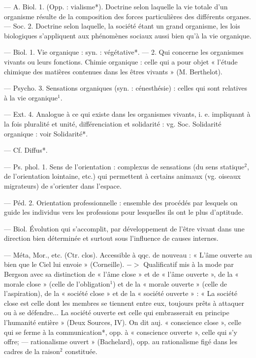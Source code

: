 \begin{itemize}[leftmargin=1cm, label=, itemsep=1pt]
 — A. Biol. 1. (Opp. :
vialisme*). Doctrine selon laquelle
la vie totale d’un organisme résulte
de la composition des forces particulières des différents organes. —
Soc. 2. Doctrine selon laquelle, la
société étant un grand organisme,
les lois biologiques s'appliquent aux
phénomènes sociaux aussi bien qu’à
la vie organique.

 — Biol. 1. Vie organique :
syn. : végétative*. — 2. Qui concerne
les organismes vivants ou leurs
fonctions. Chimie organique : celle
qui a pour objet « l’étude chimique
des matières contenues dans les
êtres vivants » (M. Berthelot).

— Psycho. 3. Sensations organiques (syn. : cénesthésie) : celles qui
sont relatives à la vie organique$^1$.

— Ext. 4. Analogue à ce qui
existe dans les organismes vivants,
i. e. impliquant à la fois pluralité et
unité, différenciation et solidarité :
vg. Soc. Solidarité organique : voir
Solidarité*.

 — Cf. Diffus*.

 — Ps. phol. 1. Sens de
l'orientation : complexus de sensations (du sens statique$^2$, de l’orientation lointaine, etc.) qui permettent
à certains animaux (vg. oiseaux migrateurs) de s'orienter dans l’espace.

— Péd. 2. Orientation professionnelle : ensemble des procédés par
lesquels on guide les individus vers
les professions pour lesquelles ils
ont le plus d’aptitude.

 — Biol. Évolution qui
s’accomplit, par développement de
l'être vivant dans une direction
bien déterminée et surtout sous
l'influence de causes internes.

 — Méta, Mor., etc. (Ctr.
clos). Accessible à qqc. de nouveau :
« L'âme ouverte au bien que le Ciel
lui envoie » (Corneille). $->$ Qualificatif mis à la mode par Bergson
avec sa distinction de « l’âme close »
et de « l'âme ouverte », de la « morale
close » (celle de l'obligation$^1$) et de
la « morale ouverte » (celle de l’aspiration), de la « société close » et de la
« société ouverte » : « La société close
est celle dont les membres se tiennent entre eux, toujours prêts à
attaquer ou à se défendre... La
société ouverte est celle qui embrasserait en principe l'humanité entière » (Deux Sources, IV). On dit auj.
« conscience close », celle qui se
ferme à la communication*, opp. à
« conscience ouverte », celle qui s’y
offre; — rationalisme ouvert »
(Bachelard), opp. au rationalisme
figé dans les cadres de la raison$^2$
constituée.

	\end{itemize}
